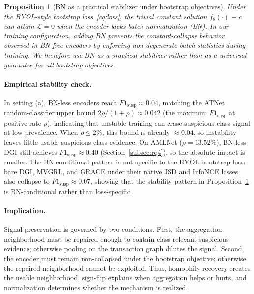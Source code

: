 \documentclass[sigconf,natbib=true,anonymous=true]{acmart}
\newtheorem{proposition}{Proposition}
\theoremstyle{definition}
\newcommand{\hofinet}{ATNet\xspace} %
\begin{document}
\begin{proposition}[BN as a practical stabilizer under bootstrap objectives]\label{thm:bn_collapse}
Under the BYOL-style bootstrap loss~\eqref{eq:loss}, the trivial constant solution $f_\theta(\cdot) \equiv c$ can attain $\mathcal{L}=0$ when the encoder lacks batch normalization (BN). In our training configuration, adding BN prevents the constant-collapse behavior observed in BN-free encoders by enforcing non-degenerate batch statistics during training. We therefore use BN as a practical stabilizer rather than as a universal guarantee for all bootstrap objectives.
\end{proposition}

\paragraph{\textbf{Empirical stability check.}} In setting (a), BN-less encoders reach $F1_{\text{susp}} \approx 0.04$, matching the \hofinet random-classifier upper bound $2\rho/(1+\rho) \approx 0.042$ (the maximum $F1_{\text{susp}}$ at positive rate $\rho$), indicating that unstable training can erase suspicious-class signal at low prevalence. When $\rho \leq 2\%$, this bound is already $\approx 0.04$, so instability leaves little usable suspicious-class evidence. On AMLNet ($\rho = 13.52\%$), BN-less DGI still achieves $F1_{\text{susp}} \approx 0.40$ (Section~\ref{subsec:rq4}), so the absolute impact is smaller. The BN-conditional pattern is not specific to the BYOL bootstrap loss: bare DGI, MVGRL, and GRACE under their native JSD and InfoNCE losses also collapse to $F1_{\text{susp}} \approx 0.07$, showing that the stability pattern in Proposition~\ref{thm:bn_collapse} is BN-conditional rather than loss-specific.

\paragraph{\textbf{Implication.}} Signal preservation is governed by two conditions. First, the aggregation neighborhood must be repaired enough to contain class-relevant suspicious evidence; otherwise pooling on the transaction graph dilutes the signal. Second, the encoder must remain non-collapsed under the bootstrap objective; otherwise the repaired neighborhood cannot be exploited. Thus, homophily recovery creates the usable neighborhood, sign-flip explains when aggregation helps or hurts, and normalization determines whether the mechanism is realized.
\end{document}
